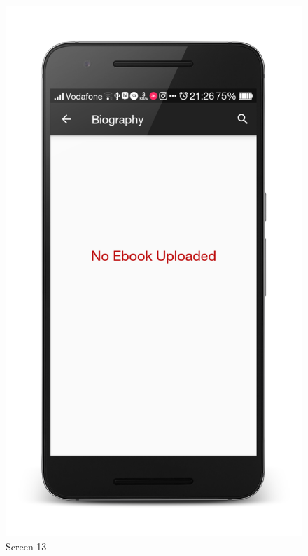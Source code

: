 \begin{figure}[ht]
\centering
\includegraphics[scale=0.13]{images/d7.png}
\caption{Screen 13}
\end{figure}

\newpage

